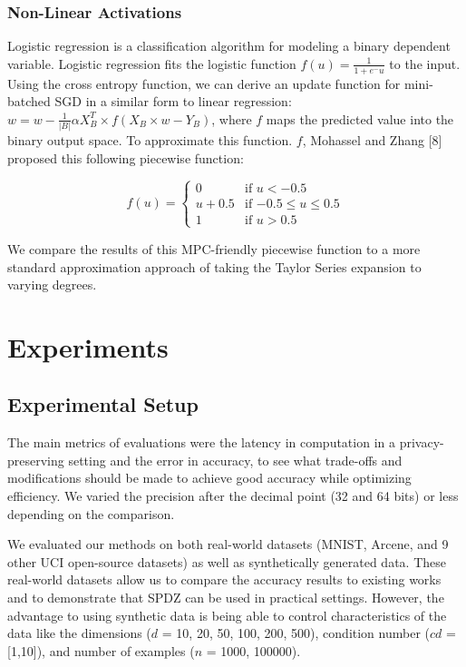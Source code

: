 \documentclass{article}
\begin{document}
\subsubsection{Non-Linear Activations}

Logistic regression is a classification algorithm for modeling a binary dependent variable. Logistic regression fits the logistic function $f(u) = \frac{1}{1+e^-u}$ to the input. Using the cross entropy function, we can derive an update function for mini-batched SGD in a similar form to linear regression: $ w = w - \frac{1}{|B|} \alpha X^{T}_{B} \times f(X_{B} \times w - Y_{B})$, where $f$ maps the predicted value into the binary output space. To approximate this function. $f$, Mohassel and Zhang [8] proposed this following piecewise function:

\[
  f(u) =
  \begin{cases}
                                   0 & \text{if $u < -0.5$} \\
                                   u + 0.5 & \text{if $-0.5 \leq u \leq 0.5$} \\
1 & \text{if $u > 0.5$}
  \end{cases}
\]

We compare the results of this MPC-friendly piecewise function to a more standard approximation approach of taking the Taylor Series expansion to varying degrees.

\section{Experiments}

\subsection{Experimental Setup}

The main metrics of evaluations were the latency in computation in a privacy-preserving setting and the error in accuracy, to see what trade-offs and modifications should be made to achieve good accuracy while optimizing efficiency. We varied the precision after the decimal point (32 and 64 bits) or less depending on the comparison.

We evaluated our methods on both real-world datasets (MNIST, Arcene, and 9 other UCI open-source datasets) as well as synthetically generated data. These real-world datasets allow us to compare the accuracy results to existing works and to demonstrate that SPDZ can be used in practical settings. However, the advantage to using synthetic data is being able to control characteristics of the data like the dimensions ($d$ = 10, 20, 50, 100, 200, 500), condition number ($cd$ = [1,10]), and number of examples ($n$ = 1000, 100000).
\end{document}
